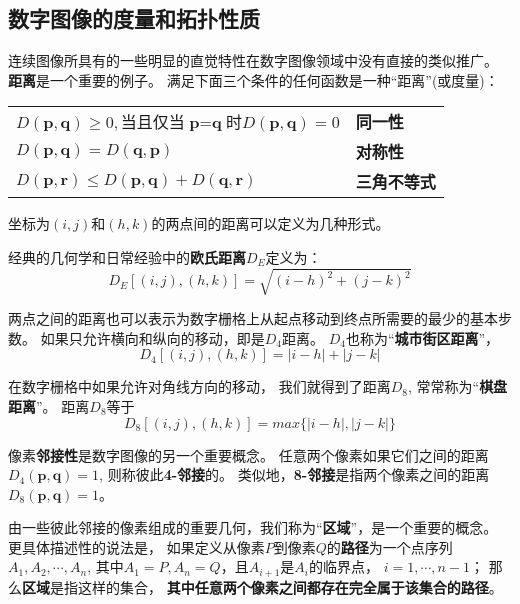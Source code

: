 \subsection{数字图像的度量和拓扑性质}
连续图像所具有的一些明显的直觉特性在数字图像领域中没有直接的类似推广。%
{\textbf{\color{magenta}距离}}是一个重要的例子。%
满足下面三个条件的任何函数是一种“距离”(或度量)：
\begin{table}[hbtp]
  \centering
  \begin{tabular}{l l}
    $D(\textbf{p},\textbf{q}) \geq 0,$当且仅当$\textbf{p}=\textbf{q}$时$D(\textbf{p},\textbf{q}) = 0$ & {\textbf{\color{magenta}同一性}}   \\
    $D(\textbf{p},\textbf{q})=D(\textbf{q},\textbf{p})$ & {\textbf{\color{magenta}对称性}} \\
    $D(\textbf{p},\textbf{r})\leq D(\textbf{p},\textbf{q})+D(\textbf{q},\textbf{r})$ & {\textbf{\color{magenta}三角不等式}}
  \end{tabular}
\end{table}

坐标为$(i,j)$和$(h,k)$的两点间的距离可以定义为几种形式。

经典的几何学和日常经验中的{\textbf{\color{magenta}欧氏距离}$D_{E}$}定义为：
\begin{equation}
  D_{E}[(i,j),(h,k)]=\sqrt{(i-h)^{2}+(j-k)^{2}}
\end{equation}

两点之间的距离也可以表示为数字栅格上从起点移动到终点所需要的最少的基本步数。%
如果只允许横向和纵向的移动，即是$D_{4}$距离。%
$D_{4}$也称为“\textbf{\color{magenta}城市街区距离}”，%
\begin{equation}
  D_{4}[(i,j),(h,k)]=|i-h|+|j-k|
\end{equation}

在数字栅格中如果允许对角线方向的移动，%
我们就得到了距离$D_{8}$,%
常常称为“\textbf{\color{magenta}棋盘距离}”。%
距离$D_{8}$等于
\begin{equation}
  D_{8}[(i,j),(h,k)]=max\{|i-h|,|j-k|\}
\end{equation}

像素\textbf{\color{magenta}邻接性}是数字图像的另一个重要概念。%
任意两个像素如果它们之间的距离$D_{4}(\textbf{p},\textbf{q})=1$,%
则称彼此\textbf{\color{magenta}4-邻接}的。%
类似地，\textbf{\color{magenta}8-邻接}是指两个像素之间的距离$D_{8}(\textbf{p},\textbf{q})=1$。%

由一些彼此邻接的像素组成的重要几何，我们称为“\textbf{\color{magenta}区域}”，是一个重要的概念。%
更具体描述性的说法是，%
如果定义从像素$P$到像素$Q$的\textbf{\color{magenta}路径}为一个点序列
$A_{1},A_{2},\cdots,A_{n}$,%
其中$A_{1}=P,A_{n}=Q$，且$A_{i+1}$是$A_{i}$的临界点，%
$i=1,\cdots,n-1$；%
那么\textbf{\color{magenta}区域}是指这样的集合，%
\textbf{\color{magenta}其中任意两个像素之间都存在完全属于该集合的路径}。


